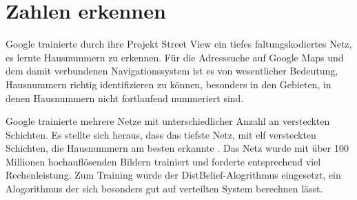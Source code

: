 
\section{Zahlen erkennen}

Google trainierte durch ihre Projekt Street View \citep{streetview} ein tiefes faltungskodiertes Netz, es lernte Hausnummern zu erkennen. Für die Adresssuche auf Google Maps und dem damit verbundenen Navigationssystem ist es von wesentlicher Bedeutung, Hausnummern richtig identifizieren zu können, besonders in den Gebieten, in denen Hausnummern nicht fortlaufend nummeriert sind.

Google trainierte mehrere Netze mit unterschiedlicher Anzahl an versteckten Schichten. Es stellte sich heraus, dass das tiefste Netz, mit elf versteckten Schichten, die Hausnummern am besten erkannte \citep{numbercharts}. Das Netz wurde mit über 100 Millionen hochauflösenden Bildern trainiert und forderte entsprechend viel Rechenleistung. Zum Training wurde der DistBelief-Alogrithmus \citep{distbelief} eingesetzt, ein Alogorithmus der sich besonders gut auf verteilten System berechnen lässt. 

